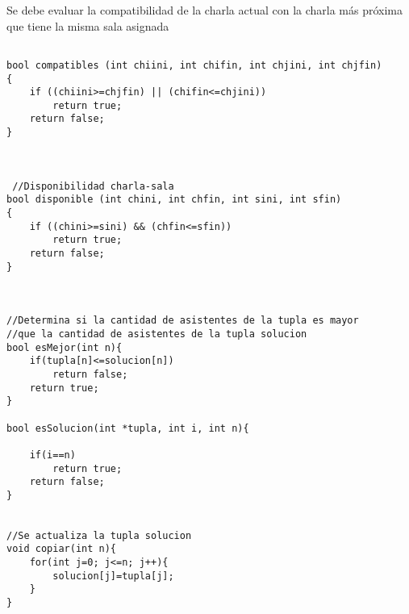 \documentclass[11pt]{article}
\begin{document}
Se debe evaluar la compatibilidad de la charla actual 
con la charla más próxima que tiene la misma sala asignada


\begin{lstlisting}

bool compatibles (int chiini, int chifin, int chjini, int chjfin)
{
	if ((chiini>=chjfin) || (chifin<=chjini))
		return true;
	return false;
}



 //Disponibilidad charla-sala
bool disponible (int chini, int chfin, int sini, int sfin)
{
	if ((chini>=sini) && (chfin<=sfin))
		return true;
	return false;
}



//Determina si la cantidad de asistentes de la tupla es mayor
//que la cantidad de asistentes de la tupla solucion
bool esMejor(int n){
	if(tupla[n]<=solucion[n])
		return false;	
	return true;
}

bool esSolucion(int *tupla, int i, int n){

	if(i==n)
		return true;
	return false;
}


//Se actualiza la tupla solucion
void copiar(int n){
	for(int j=0; j<=n; j++){
		solucion[j]=tupla[j];
	}
}

\end{lstlisting}
\end{document}
